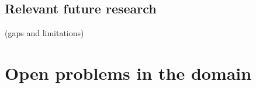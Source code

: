 \subsection{Relevant future research} (gaps and limitations)


\section{Open problems in the domain}






